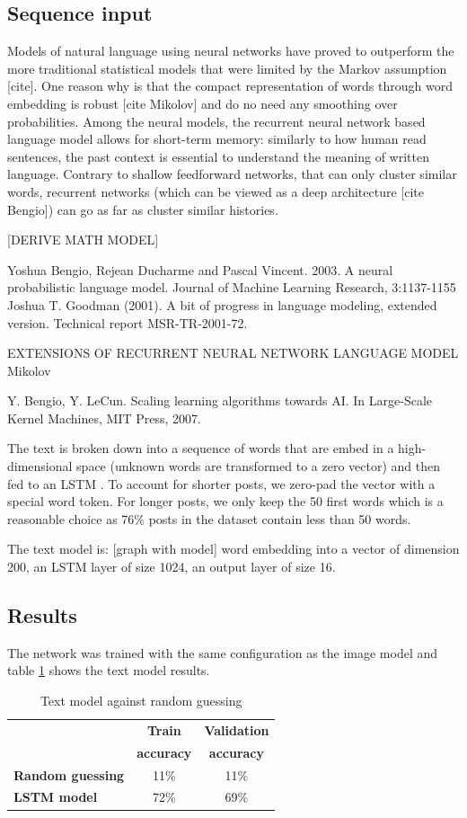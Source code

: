 \documentclass{article} %
\begin{document}
\subsection{Sequence input}
Models of natural language using neural networks have proved to outperform the more traditional statistical models that were limited by the Markov assumption [cite]. One reason why is that the compact representation of words through word embedding is robust [cite Mikolov] and do no need any smoothing over probabilities. Among the neural models, the recurrent neural network based language model allows for short-term memory: similarly to how human read sentences, the past context is essential to understand the meaning of written language. Contrary to shallow feedforward networks, that can only cluster similar words, recurrent networks (which can be viewed as a deep architecture [cite Bengio]) can go as far as cluster similar histories. 

[DERIVE MATH MODEL]

Yoshua Bengio, Rejean Ducharme and Pascal Vincent. 2003.
A neural probabilistic language model. Journal of Machine
Learning Research, 3:1137-1155
Joshua T. Goodman (2001). A bit of progress in language modeling,
extended version. Technical report MSR-TR-2001-72.

EXTENSIONS OF RECURRENT NEURAL NETWORK LANGUAGE MODEL Mikolov

Y. Bengio, Y. LeCun. Scaling learning algorithms towards AI.
In Large-Scale Kernel Machines, MIT Press, 2007.


The text is broken down into a sequence of words that are embed in a high-dimensional space (unknown words are transformed to a zero vector) and then fed to an LSTM \citep{Hochreiter-97}. To account for shorter posts, we zero-pad the vector with a special word token. For longer posts, we only keep the 50 first words which is a reasonable choice as 76\% posts in the dataset contain less than 50 words.

The text model is: [graph with model]
word embedding into a vector of dimension 200, an LSTM layer of size 1024, an output layer of size 16.

\subsection{Results}
The network was trained with the same configuration as the image model and table \ref{text-results} shows the text model results.

\begin{table}[H]
\caption{Text model against random guessing}
\begin{center}
    \begin{tabular}{l | c | c}
    & \textbf{Train} & \textbf{Validation} \\
    & \textbf{accuracy} & \textbf{accuracy} \\ \hline
    \textbf{Random guessing} & 11\% & 11\% \\ \hline
    \textbf{LSTM model}  & 72\% & 69\% \\
    \end{tabular}
\end{center}
\label{text-results}
\end{table}
\end{document}
